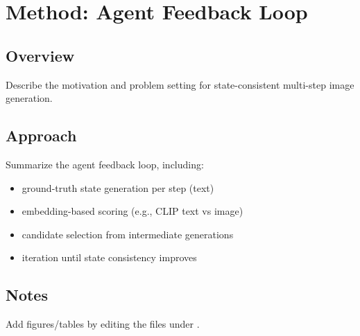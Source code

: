 \chapter{Method: Agent Feedback Loop}


\section{Overview}
Describe the motivation and problem setting for state-consistent multi-step image generation.

\section{Approach}
Summarize the agent feedback loop, including:
\begin{itemize}
  \item ground-truth state generation per step (text)
  \item embedding-based scoring (e.g., CLIP text vs image)
  \item candidate selection from intermediate generations
  \item iteration until state consistency improves
\end{itemize}

\section{Notes}
Add figures/tables by editing the files under \texttt{}.
